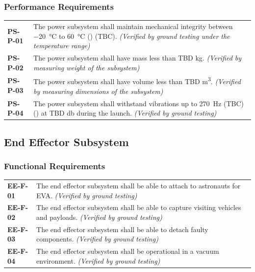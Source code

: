 \documentclass[12pt, letterpaper]{article}
\begin{document}
\subsubsection*{Performance Requirements}
\vspace{-20pt}
\begin{longtable}{P{2cm}P{13.75cm}}
\textbf{PS-P-01}	&
The power subsystem shall maintain mechanical integrity between \SI{-20}{\degreeCelsius} to \SI{60}{\degreeCelsius} () (TBC).
\textit{(Verified by ground testing under the temperature range)}	\\
\textbf{PS-P-02}	&
The power subsystem shall have mass less than TBD \si{\kilo\gram}.
\textit{(Verified by measuring weight of the subsystem)}	\\
\textbf{PS-P-03}	&
The power subsystem shall have volume less than TBD \si{\metre\cubed}.
\textit{(Verified by measuring dimensions of the subsystem)}	\\
\textbf{PS-P-04}	&
The power subsystem shall withstand vibrations up to \SI{270}{\hertz} (TBC) () at TBD \si{\decibel} during the launch.
\textit{(Verified by ground testing)}
\end{longtable}

\subsection{End Effector Subsystem}
\label{sect:endeffector}
\subsubsection*{Functional Requirements}
\vspace{-20pt}
\begin{longtable}{P{2cm}P{13.75cm}}
\textbf{EE-F-01}	&
The end effector subsystem shall be able to attach to astronauts for EVA.
\textit{(Verified by ground testing)}	\\
\textbf{EE-F-02}	& The end effector subsystem shall be able to capture visiting vehicles and payloads.
\textit{(Verified by ground testing)}	\\
\textbf{EE-F-03}	&
The end effector subsystem shall be able to detach faulty components.
\textit{(Verified by ground testing)}	\\
\textbf{EE-F-04}	&
The end effector subsystem shall be operational in a vacuum environment.
\textit{(Verified by ground testing)}
\end{longtable}
\end{document}
